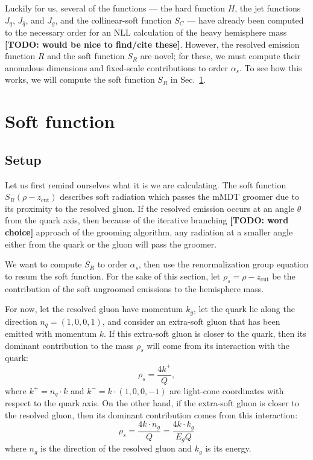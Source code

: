 \documentclass[12pt,twoside,class=../reedthesis, crop=false]{standalone}
\providecommand{\zcut}{z_\mathrm{{cut}}}
\begin{document}
	Luckily for us, several of the functions --- the hard function $H$, the jet functions $J_q$, $J_{\bar q}$, and $J_g$, and the collinear-soft function $S_C$ --- have already been computed to the necessary order for an NLL calculation of the heavy hemisphere mass {\color{red}\textbf{[TODO: would be nice to find/cite these]}}. However, the resolved emission function $R$ and the soft function $S_R$ are novel; for these, we must compute their anomalous dimensions and fixed-scale contributions to order $\alpha_s$. To see how this works, we will compute the soft function $S_R$ in Sec.~\ref{sec:soft function calculation}.
	

\section{Soft function}\label{sec:soft function calculation}
\subsection{Setup}
	Let us first remind ourselves what it is we are calculating. The soft function $S_R(\rho - \zcut)$ describes soft radiation which passes the mMDT groomer due to its proximity to the resolved gluon. If the resolved emission occurs at an angle $\theta$ from the quark axis, then because of the iterative branching {\color{red}\textbf{[TODO: word choice]}} approach of the grooming algorithm, any radiation at a smaller angle either from the quark or the gluon will pass the groomer.

	We want to compute $S_R$ to order $\alpha_s$, then use the renormalization group equation to resum the soft function. For the sake of this section, let $\rho_s = \rho - \zcut$ be the contribution of the soft ungroomed emissions to the hemisphere mass.

	For now, let the resolved gluon have momentum $k_g$, let the quark lie along the direction $n_q = (1, 0, 0, 1)$, and consider an extra-soft gluon that has been emitted with momentum $k$. If this extra-soft gluon is closer to the quark, then its dominant contribution to the mass $\rho_s$ will come from its interaction with the quark:
	\begin{equation}
		\rho_s = \frac{4k^+}{Q},
	\end{equation}
	where $k^+ = n_q \cdot k$ and $k^- = k \cdot (1, 0, 0, -1)$ are light-cone coordinates with respect to the quark axis. On the other hand, if the extra-soft gluon is closer to the resolved gluon, then its dominant contribution comes from this interaction:
	\begin{equation}
		\rho_s = \frac{4 k \cdot n_g}{Q} = \frac{4 k \cdot k_g}{E_g Q}
	\end{equation}
	where $n_g$ is the direction of the resolved gluon and $k_g$ is its energy.
\end{document}

